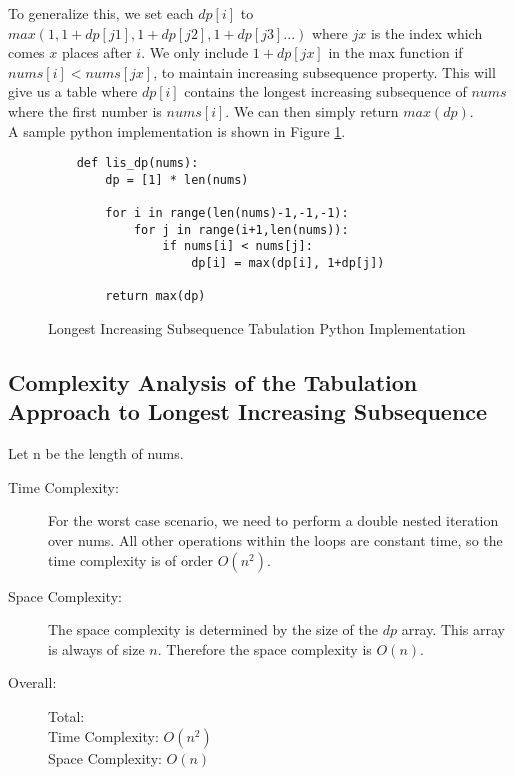 To generalize this, we set each $dp[i]$ to $max(1,1+dp[j1],1+dp[j2],1+dp[j3]...)$ where $jx$ is the index which comes $x$ places after $i$.
We only include $1+dp[jx]$ in the max function if $nums[i] < nums[jx]$, to maintain increasing subsequence property.
This will give us a table where $dp[i]$ contains the longest increasing subsequence of $nums$ where the first number is $nums[i]$.
We can then simply return $max(dp)$.\\

A sample python implementation is shown in Figure \ref{fig:lis-dp}.

\begin{figure}[H]
    \centering
    \begin{lstlisting}
    def lis_dp(nums):
        dp = [1] * len(nums)
    
        for i in range(len(nums)-1,-1,-1):
            for j in range(i+1,len(nums)):
                if nums[i] < nums[j]:
                    dp[i] = max(dp[i], 1+dp[j])
    
        return max(dp)
    \end{lstlisting}
    \caption{Longest Increasing Subsequence Tabulation Python Implementation}
    \label{fig:lis-dp}
\end{figure}

\subsection{Complexity Analysis of the Tabulation Approach to Longest Increasing Subsequence}
Let n be the length of nums.
\begin{description}
    \item[Time Complexity:]
        For the worst case scenario, we need to perform a double nested iteration over nums.
        All other operations within the loops are constant time, so the time complexity is of order $O(n^2)$.
        
    \item[Space Complexity:] 
        The space complexity is determined by the size of the $dp$ array. This array is always of size $n$.
        Therefore the space complexity is $O(n)$.
        
        
    \item[Overall:] Total:\\
        Time Complexity: $O(n^2)$\\
        Space Complexity: $O(n)$
    
\end{description}

